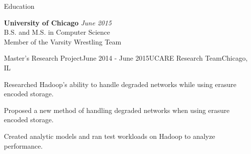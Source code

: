 \documentclass{resume} %
\begin{document}

\begin{rSection}{Education}

{\bf University of Chicago} \hfill {\em June 2015} \\ 
B.S. and M.S. in Computer Science \\
Member of the Varsity Wrestling Team \\

\vspace{-1em}

\begin{rSubsection}{Master's Research Project}{June 2014 - June 2015}{UCARE Research Team}{Chicago, IL}
\item Researched Hadoop's ability to handle degraded networks while using erasure encoded storage.
\item Proposed a new method of handling degraded networks when using erasure encoded storage.
\item Created analytic models and ran test workloads on Hadoop to analyze performance.
\end{rSubsection}

\end{rSection}

\end{document}
